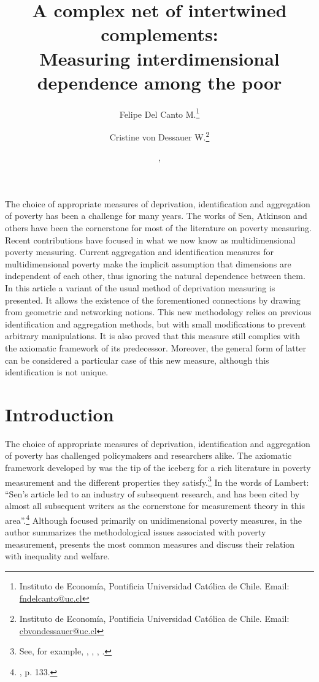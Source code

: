 \documentclass[english, a4paper,12pt]{article}
\author{
  Felipe Del Canto M.\footnote{Instituto de Economía, Pontificia Universidad Católica de Chile. Email: \href{mailto:fndelcanto@uc.cl}{fndelcanto@uc.cl}}
  \and
  Cristine von Dessauer W.\footnote{Instituto de Economía, Pontificia Universidad Católica de Chile. Email: \href{mailto:cbvondessauer@uc.cl}{cbvondessauer@uc.cl}}
}
\title{A complex net of intertwined complements: \\ Measuring interdimensional dependence among the poor}
\date{\monthname, \the\year}
\begin{document}
\maketitle
\thispagestyle{empty}

\vfill
{\abstract The choice of appropriate measures of deprivation, identification and aggregation of poverty has been a challenge for many years. The works of Sen, Atkinson and others have been the cornerstone for most of the literature on poverty measuring. Recent contributions have focused in what we now know as multidimensional poverty measuring. Current aggregation and identification measures for multidimensional poverty make the implicit assumption that dimensions are independent of each other, thus ignoring the natural dependence between them. In this article a variant of the usual method of deprivation measuring is presented. It allows the existence of the forementioned connections by drawing from geometric and networking notions. This new methodology relies on previous identification and aggregation methods, but with small modifications to prevent arbitrary manipulations. It is also proved that this measure still complies with the axiomatic framework of its predecessor. Moreover, the general form of latter can be considered a particular case of this new measure, although this identification is not unique.}
\vfill


\newpage
\section{Introduction}
The choice of appropriate measures of deprivation, identification and aggregation of poverty has challenged policymakers and researchers alike. The axiomatic framework developed by \cite{Sen76} was the tip of the iceberg for a rich literature in poverty measurement and the different properties they satisfy.\footnote{See, for example, \cite{Atkinson87}, \cite{FGTpaper}, \cite{Sen76, Sen79}, \cite{RavallionMPIBook}.} In the words of Lambert: ``Sen's article led to an industry of subsequent research, and has been cited by almost all subsequent writers as the cornerstone for measurement theory in this area''.\footnote{\cite{LambertPoverty}, p. 133.} Although focused primarily on unidimensional poverty measures, in \cite{LambertPoverty} the author summarizes the methodological issues associated with poverty measurement, presents the most common measures and discuss their relation with inequality and welfare. 
\end{document}
